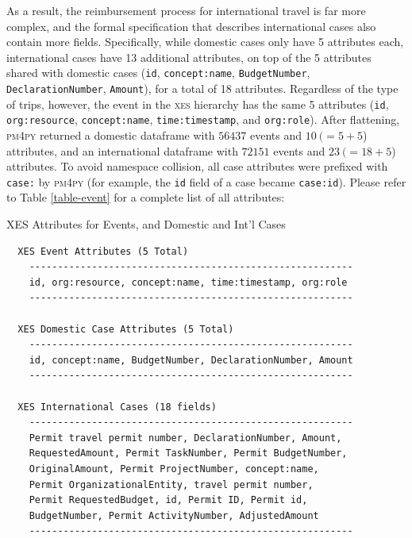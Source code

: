 \documentclass[conference]{IEEEtran}
\begin{document}
As a result, the reimbursement process for international travel is
far more complex, and the formal specification that describes
international cases also contain more fields.
Specifically, while domestic cases only have 5 attributes
each, international cases have 13 additional attributes, on top of
the 5 attributes shared with domestic cases
(\texttt{id}, \texttt{concept:name}, \texttt{BudgetNumber},
\texttt{DeclarationNumber}, \texttt{Amount}), for a total of 18 attributes.
Regardless of the type of trips, however,
the event in the \textsc{xes} hierarchy has the same 5 attributes
(\texttt{id}, \texttt{org:resource}, \texttt{concept:name},
\texttt{time:timestamp}, and \texttt{org:role}).
After flattening, \textsc{pm4py} returned a
domestic dataframe with $56437$ events and $10~(=5+5$) attributes, and
an international dataframe with $72151$ events and $23~(=18+5$) attributes.
To avoid namespace collision, all case attributes were prefixed with
\texttt{case:} by \textsc{pm4py} (for example, the \texttt{id} field of a case
became \texttt{case:id}). Please refer to Table
\ref{table-event} for a complete list of all attributes:

\begin{table}[htbp]
\caption{XES Attributes for Events, and Domestic and Int'l Cases}
\vspace{-1em}
\begin{center}
\begin{verbatim}
  XES Event Attributes (5 Total)
    ---------------------------------------------------------
    id, org:resource, concept:name, time:timestamp, org:role
    ---------------------------------------------------------

  XES Domestic Case Attributes (5 Total)
    ---------------------------------------------------------
    id, concept:name, BudgetNumber, DeclarationNumber, Amount
    ---------------------------------------------------------

  XES International Cases (18 fields)
    ---------------------------------------------------------
    Permit travel permit number, DeclarationNumber, Amount,
    RequestedAmount, Permit TaskNumber, Permit BudgetNumber,
    OriginalAmount, Permit ProjectNumber, concept:name,
    Permit OrganizationalEntity, travel permit number,
    Permit RequestedBudget, id, Permit ID, Permit id,
    BudgetNumber, Permit ActivityNumber, AdjustedAmount        
    ---------------------------------------------------------
\end{verbatim}
\end{center}
\vspace{-1em}
\label{table-event}
\end{table}
\end{document}
